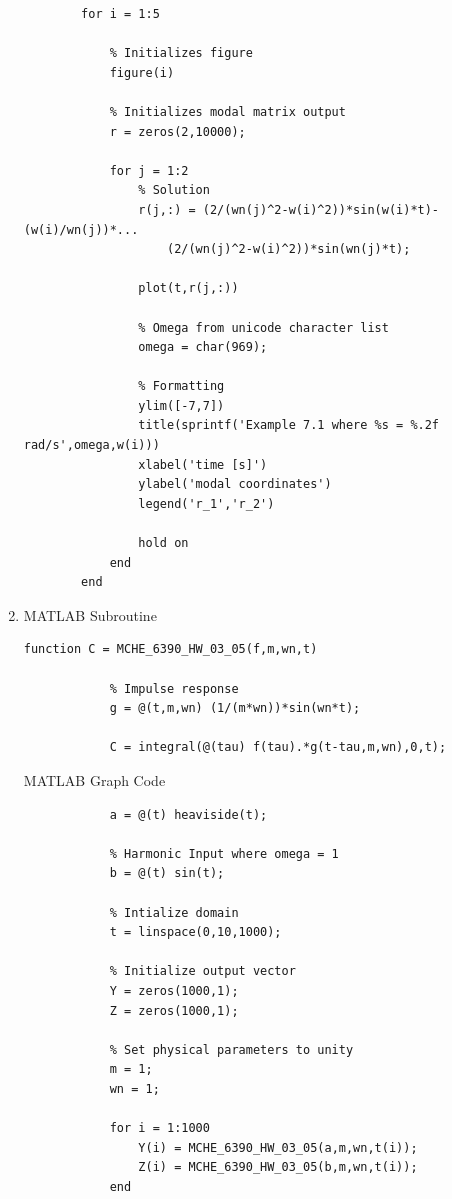 \documentclass{article}
\begin{document}
\begin{enumerate}
\begin{lstlisting}[style=Matlab-editor]
        % length of w = 5
        for i = 1:5
            
            % Initializes figure
            figure(i)
            
            % Initializes modal matrix output
            r = zeros(2,10000);
            
            for j = 1:2
                % Solution
                r(j,:) = (2/(wn(j)^2-w(i)^2))*sin(w(i)*t)-(w(i)/wn(j))*...
                    (2/(wn(j)^2-w(i)^2))*sin(wn(j)*t);
                
                plot(t,r(j,:))
                
                % Omega from unicode character list
                omega = char(969);
                
                % Formatting
                ylim([-7,7])
                title(sprintf('Example 7.1 where %s = %.2f rad/s',omega,w(i)))
                xlabel('time [s]')
                ylabel('modal coordinates')
                legend('r_1','r_2')
                
                hold on
            end
        end
        \end{lstlisting}
    \item 
    MATLAB Subroutine
        \begin{lstlisting}[style=Matlab-editor]
            function C = MCHE_6390_HW_03_05(f,m,wn,t)
            
            % Impulse response
            g = @(t,m,wn) (1/(m*wn))*sin(wn*t);
            
            C = integral(@(tau) f(tau).*g(t-tau,m,wn),0,t);
        \end{lstlisting}
    MATLAB Graph Code
        \begin{lstlisting}[style=Matlab-editor]
            % Step Input
            a = @(t) heaviside(t);
            
            % Harmonic Input where omega = 1
            b = @(t) sin(t);
            
            % Intialize domain
            t = linspace(0,10,1000);
            
            % Initialize output vector
            Y = zeros(1000,1);
            Z = zeros(1000,1);
            
            % Set physical parameters to unity
            m = 1;
            wn = 1;
            
            for i = 1:1000
                Y(i) = MCHE_6390_HW_03_05(a,m,wn,t(i));
                Z(i) = MCHE_6390_HW_03_05(b,m,wn,t(i));
            end
            

\end{lstlisting}
\end{enumerate}
\end{document}
